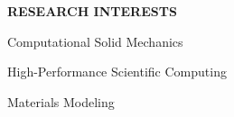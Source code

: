 \documentclass[11pt]{article}
\newlength{\sectionskip} \setlength{\sectionskip}{0.2in}
\newlength{\listskip} \setlength{\listskip}{0.05in}
\newlength{\minipagewidth} \setlength{\minipagewidth}{6.25in} %
\newlength{\myparindent} \setlength{\myparindent}{0.25in}
\begin{document}
\vspace{\sectionskip}
\noindent
{\large \textbf{RESEARCH INTERESTS}}
\vspace{\sectionskip}

\begin{minipage}{\minipagewidth}
Computational Solid Mechanics

\vspace{\listskip}
High-Performance Scientific Computing

\vspace{\listskip}
Materials Modeling
\end{minipage}\vspace{\parskip}

%

%



%


%

\vspace{-0.1in}

\begin{bibunit}[unsrtnat]
  \renewcommand{\refname}{{\large PEER-REVIEWED JOURNAL ARTICLES}\\ {\normalsize \normalfont \href{https://scholar.google.com/citations?user=yd6y6noAAAAJ&hl=en&oi=ao}{Google Scholar Profile}}}
  \nocite{*}
\end{bibunit}
\end{document}

